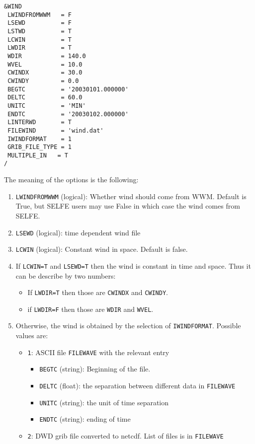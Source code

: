\documentclass[12pt]{amsart}
\begin{document}
\begin{verbatim}
&WIND
 LWINDFROMWWM   = F      
 LSEWD          = F      
 LSTWD          = T      
 LCWIN          = T      
 LWDIR          = T      
 WDIR           = 140.0  
 WVEL           = 10.0   
 CWINDX         = 30.0   
 CWINDY         = 0.0    
 BEGTC          = '20030101.000000'
 DELTC          = 60.0             
 UNITC          = 'MIN'            
 ENDTC          = '20030102.000000'
 LINTERWD       = T                
 FILEWIND       = 'wind.dat'       
 IWINDFORMAT    = 1                
 GRIB_FILE_TYPE = 1   
 MULTIPLE_IN   = T 
/
\end{verbatim}
The meaning of the options is the following:
\begin{enumerate}
\item {\tt LWINDFROMWWM} (logical): Whether wind should come from WWM. Default is True, but SELFE users may use False in which case the wind comes from SELFE.
\item {\tt LSEWD} (logical): time dependent wind file
\item {\tt LCWIN} (logical): Constant wind in space. Default is false.
\item If {\tt LCWIN=T} and {\tt LSEWD=T} then the wind is constant in time and space. Thus it can be describe by two numbers:
  \begin{itemize}
  \item If {\tt LWDIR=T} then those are {\tt CWINDX} and {\tt CWINDY}.
  \item if {\tt LWDIR=F} then those are {\tt WDIR} and {\tt WVEL}.
  \end{itemize}
\item Otherwise, the wind is obtained by the selection of {\tt IWINDFORMAT}. Possible values are:
  \begin{itemize}
  \item {\tt 1}: ASCII file {\tt FILEWAVE} with the relevant entry
    \begin{itemize}
    \item {\tt BEGTC} (string): Beginning of the file.
    \item {\tt DELTC} (float): the separation between different data in {\tt FILEWAVE}
    \item {\tt UNITC} (string): the unit of time separation
    \item {\tt ENDTC} (string): ending of time 
    \end{itemize}
  \item {\tt 2}: DWD grib file converted to netcdf. List of files is in {\tt FILEWAVE}

\end{itemize}
\end{enumerate}
\end{document}
